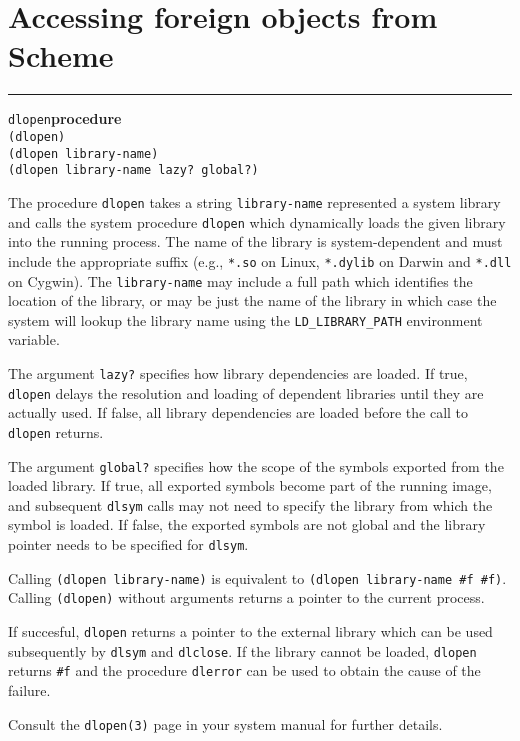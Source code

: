\documentclass[onecolumn, 12pt, twoside, openright, dvipdfm]{book}
\makeatletter
\newcommand{\idxlabeldefun}[5]{
\vspace{1ex}
\rule{\textwidth}{2pt}
{\phantomsection\index{#1@\texttt{#2}}\label{#3}{\Large\texttt{#4}}\hfill\textbf{#5}}\\}
\newcommand{\idxdefun}[3]{\idxlabeldefun{#1}{#2}{#1}{#2}{#3}}
\newcommand{\defun}[2]{\idxdefun{#1}{#1}{#2}}
\makeatother
\begin{document}
\section{\label{sec:foreign-objects}Accessing foreign objects from
Scheme}


\defun{dlopen}{procedure}
\texttt{(dlopen)}\\
\texttt{(dlopen library-name)}\\
\texttt{(dlopen library-name lazy? global?)}

The procedure \texttt{dlopen} takes a string \texttt{library-name}
represented a system library and calls the system procedure
\texttt{dlopen} which dynamically loads the given library into the
running process.  The name of the library is system-dependent and
must include the appropriate suffix (e.g., \texttt{*.so} on Linux,
\texttt{*.dylib} on Darwin and \texttt{*.dll} on Cygwin).  The
\texttt{library-name} may include a full path which identifies the
location of the library, or may be just the name of the library in
which case the system will lookup the library name using the
\texttt{LD\_LIBRARY\_PATH} environment variable.

The argument \texttt{lazy?} specifies how library dependencies are
loaded.  If true, \texttt{dlopen} delays the resolution and loading
of dependent libraries until they are actually used.  If false, all
library dependencies are loaded before the call to \texttt{dlopen}
returns.

The argument \texttt{global?} specifies how the scope of the symbols
exported from the loaded library.  If true, all exported symbols
become part of the running image, and subsequent \texttt{dlsym}
calls may not need to specify the library from which the symbol is
loaded.  If false, the exported symbols are not global and the
library pointer needs to be specified for \texttt{dlsym}.

Calling \texttt{(dlopen library-name)} is equivalent to
\texttt{(dlopen library-name \#f \#f)}.  Calling \texttt{(dlopen)}
without arguments returns a pointer to the current process.

If succesful, \texttt{dlopen} returns a pointer to the external
library which can be used subsequently by \texttt{dlsym} and
\texttt{dlclose}.  If the library cannot be loaded, \texttt{dlopen}
returns \texttt{\#f} and the procedure \texttt{dlerror} can be used
to obtain the cause of the failure.

Consult the \texttt{dlopen(3)} page in your system manual for
further details.
\end{document}
